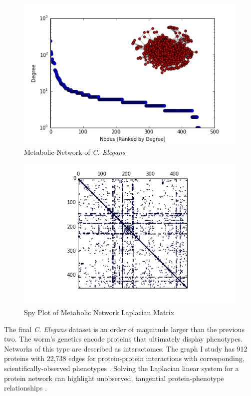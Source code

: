 \documentclass{article}
\begin{document}
\begin{figure}
\centering

\includegraphics[width=\linewidth]{meta_degree_histogram.png}
\caption{Metabolic Network of \textit{C. Elegans}}
  
\end{figure}
\begin{figure}
\centering
\includegraphics[width = \linewidth]{metaspy.png}
\caption{Spy Plot of Metabolic Network Laplacian Matrix}
\end{figure}


The final \textit{C. Elegans} dataset is an order of magnitude larger than the previous two. The worm's genetics encode proteins that ultimately display phenotypes. Networks of this type are described as interactomes. The graph I study has 912 proteins with 22,738 edges for protein-protein interactions with corresponding, scientifically-observed phenotypes \cite{Simonis:2009}. Solving the Laplacian linear system for a protein network can highlight unobserved, tangential protein-phenotype relationships \cite{Gleich:2015}.
\end{document}
